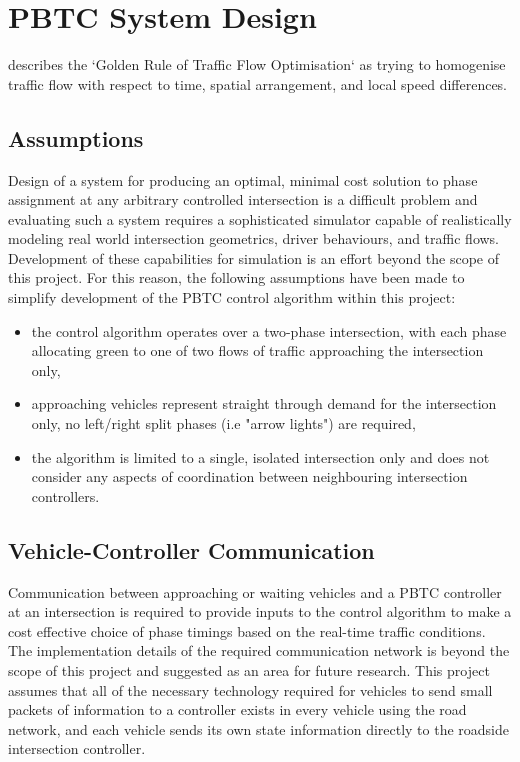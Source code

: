 \section{PBTC System Design}

  describes the `Golden Rule of Traffic Flow Optimisation` as trying to homogenise traffic flow with respect to time, spatial arrangement, and local speed differences.

\subsection{Assumptions}

Design of a system for producing an optimal, minimal cost solution to phase assignment at any arbitrary controlled intersection is a difficult problem and evaluating such a system requires a sophisticated simulator capable of realistically modeling real world intersection geometrics, driver behaviours, and traffic flows. Development of these capabilities for simulation is an effort beyond the scope of this project. For this reason, the following assumptions have been made to simplify development of the PBTC control algorithm within this project:

\begin{itemize}
\item the control algorithm operates over a two-phase intersection, with each phase allocating green to one of two flows of traffic approaching the intersection only,
\item approaching vehicles represent straight through demand for the intersection only, no left/right split phases (i.e "arrow lights") are required,
\item the algorithm is limited to a single, isolated intersection only and does not consider any aspects of coordination between neighbouring intersection controllers.
\end{itemize}

\subsection{Vehicle-Controller Communication}

Communication between approaching or waiting vehicles and a PBTC controller at an intersection is required to provide inputs to the control algorithm to make a cost effective choice of phase timings based on the real-time traffic conditions. The implementation details of the required communication network is beyond the scope of this project and suggested as an area for future research. This project assumes that all of the necessary technology required for vehicles to send small packets of information to a controller exists in every vehicle using the road network, and each vehicle sends its own state information directly to the roadside intersection controller.

